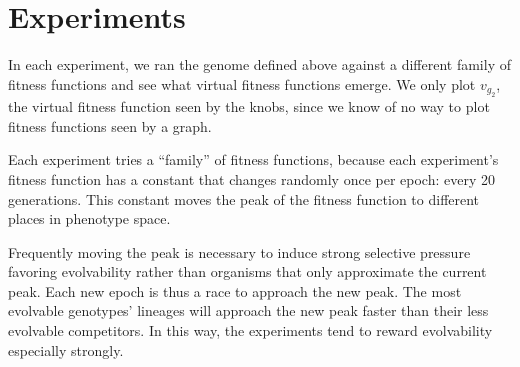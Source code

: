 \documentclass[letterpaper]{article}
\begin{document}
\section{Experiments}

In each experiment, we ran the genome defined above against a different family
of fitness functions and see what virtual fitness functions emerge. We only
plot $v_{g_2}$, the virtual fitness function seen by the knobs, since we know
of no way to plot fitness functions seen by a graph.

Each experiment tries a ``family'' of fitness functions, because each
experiment's fitness function has a constant that changes randomly once per
epoch: every 20 generations. This constant moves the peak of the fitness
function to different places in phenotype space.

Frequently moving the peak is necessary to induce strong selective pressure
favoring evolvability rather than organisms that only approximate the current
peak.
Each new epoch is thus a race to approach the new peak. The most
evolvable genotypes' lineages will approach the new peak faster than their
less evolvable competitors. In this way, the experiments tend to reward
evolvability especially strongly.
\end{document}
